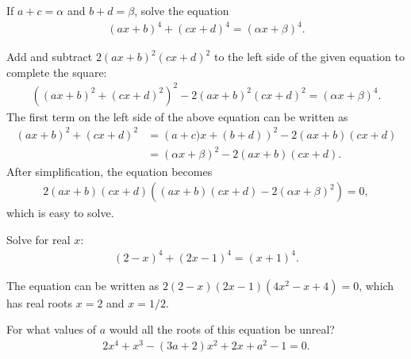 \documentclass[12pt,a4paper]{memoir}
\theoremstyle{definition}
\begin{document}
\begin{tcolorbox}
	\begin{question}
		If $a+c = \alpha$ and $b+d = \beta$, solve the equation
		\begin{align*}
			(ax+b)^4 + (cx+d)^4 = (\alpha x + \beta)^4.
		\end{align*}
	\end{question}
\end{tcolorbox}

\begin{solution}[name=Solution by Parviz Shahriari]
	Add and subtract $2(ax+b)^2(cx+d)^2$ to the left side of the given equation to complete the square:
	\begin{align*}
		\left((ax+b)^2 + (cx+d)^2\right)^2 - 2(ax+b)^2(cx+d)^2 = (\alpha x + \beta)^4.
	\end{align*}
	The first term on the left side of the above equation can be written as
	\begin{align*}
		(ax+b)^2 + (cx+d)^2 &= \left(a+c)x + (b+d)\right)^2 - 2(ax+b)(cx+d)\\
		&= (\alpha x + \beta)^2 - 2(ax+b)(cx+d).
	\end{align*}
	After simplification, the equation becomes
	\begin{align*}
		2(ax+b)(cx+d)\left((ax+b)(cx+d)-2(\alpha x + \beta)^2\right) = 0,
	\end{align*}
	which is easy to solve.
\end{solution}



\begin{tcolorbox}
	\begin{question}
		Solve for real $x$:
		\begin{align*}
			(2-x)^4 + (2x-1)^4 = (x+1)^4.
		\end{align*}
	\end{question}
\end{tcolorbox}

\begin{solution}[name=Solution by Parviz Shahriari]
	The equation can be written as $2(2-x)(2x-1)(4x^2-x+4)=0$, which has real roots $x=2$ and  $x=1/2$.
\end{solution}




\begin{tcolorbox}
	\begin{question}
		For what values of $a$ would all the roots of this equation be unreal?
		\begin{align*}
			2x^4 + x^3 - (3a+2)x^2 + 2x + a^2 -1 = 0.
		\end{align*}
	\end{question}
\end{tcolorbox}
\end{document}
